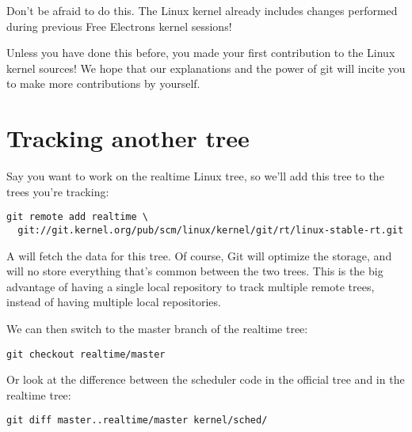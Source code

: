 Don't be afraid to do this. The Linux kernel already includes changes
performed during previous Free Electrons kernel sessions!

Unless you have done this before, you made your first contribution 
to the Linux kernel sources! We hope that our explanations and the power 
of git will incite you to make more contributions by yourself.

\section{Tracking another tree}

Say you want to work on the realtime Linux tree, so we'll add this
tree to the trees you're tracking:

\small
\begin{verbatim}
git remote add realtime \
  git://git.kernel.org/pub/scm/linux/kernel/git/rt/linux-stable-rt.git
\end{verbatim}
\normalsize

A  will fetch the data for this tree. Of course, Git
will optimize the storage, and will no store everything that's common
between the two trees. This is the big advantage of having a single
local repository to track multiple remote trees, instead of having
multiple local repositories.

We can then switch to the master branch of the realtime tree:

\begin{verbatim}
git checkout realtime/master
\end{verbatim}

Or look at the difference between the scheduler code in the official
tree and in the realtime tree:

\begin{verbatim}
git diff master..realtime/master kernel/sched/
\end{verbatim}

